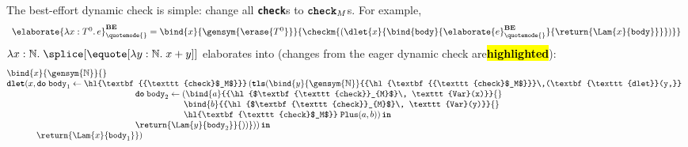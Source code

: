 The best-effort dynamic check is simple: change all \textbf{\texttt{check}}s to $\textbf{\texttt{check}}_M$s. For example, 
{
  \footnotesize
\[
\begin{array}{rcl}
\elaborate{\lambda x: T^0. \, e}_{\quotemode{}}^{\textbf{BE}} = \bind{x}{\gensym{\erase{T^0}}}{\checkm{(\dlet{x}{\bind{\texttt{body}}{\elaborate{e}_{\quotemode{}}^\textbf{BE}}{\return{\Lam{x}{\texttt{body}}}}})}}
\end{array}\]
}
$\lambda x:\mathbb{N}. \; \splice[{\equote[\lambda{y}: \mathbb{N}. \; x+y]}]$ elaborates into (changes from the eager dynamic check are\textbf{\hl{highlighted}}):
{
  \renewcommand{\varToAST}[1]{\hl{$\textbf{\texttt{check}}_{M}$}\, \texttt{Var}(#1)}
\[\begin{array}{@{}l}
  \bind{x}{\gensym{\mathbb{N}}}{} \\
  {\textbf{\texttt{dlet}}(}{x}, \textbf{\texttt{do}} \; {\texttt{body}_1} \leftarrow {{\hl{\textbf{{\texttt{check}$_M$}}}}}\,(\textbf{\texttt{tls}}({\bind{y}{\gensym{\mathbb{N}}}{{\hl{\textbf{{\texttt{check}$_M$}}}\,(\textbf{\texttt{dlet}}(y,}}} \\
    \quad\quad\quad\quad\quad\quad\quad
    \quad\quad\quad\quad\quad\quad\quad\;\;\,\,
    \textbf{\texttt{do}}\;{\texttt{body}_2} \leftarrow {(\bind{a}{{\varToAST{x}}}{}}\\
    \quad\quad\quad\quad\quad\quad\quad
    \quad\quad\quad\quad\quad\quad\quad
    \quad\quad\quad\quad\quad\quad\,\,\,
    \bind{b}{{\varToAST{y}}}{}\\
     \quad\quad\quad\quad\quad\quad\quad
    \quad\quad\quad\quad\quad\quad\quad
    \quad\quad\quad\quad\quad\quad\,\,\,
    \hl{\textbf{\texttt{check}$_M$}}\;{\texttt{Plus}(a, b)}) \, \textbf{\texttt{in}}\\
    \quad\quad\quad\quad\quad\quad\quad
    \quad\quad\quad\quad\quad\quad\quad\;\;\,\,
    \return{\Lam{y}{\texttt{body}_2}}{{))}})) \, \textbf{\texttt{in}}\\
  \quad\quad\quad\;\, {\return{\Lam{x}{\texttt{body}_1}}})
\end{array}\]
}

